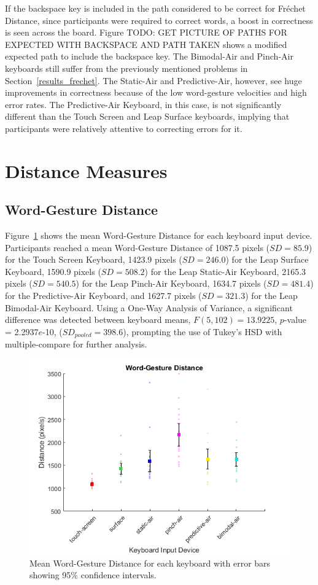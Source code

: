 If the backspace key is included in the path considered to be correct for Fr\'echet Distance, since participants were required to correct words, a boost in correctness is seen across the board. Figure TODO: GET PICTURE OF PATHS FOR EXPECTED WITH BACKSPACE AND PATH TAKEN shows a modified expected path to include the backspace key. The Bimodal-Air and Pinch-Air keyboards still suffer from the previously mentioned problems in Section~\ref{results_frechet}. The Static-Air and Predictive-Air, however, see huge improvements in correctness because of the low word-gesture velocities and high error rates. The Predictive-Air Keyboard, in this case, is not significantly different than the Touch Screen and Leap Surface keyboards, implying that participants were relatively attentive to correcting errors for it.

\section{Distance Measures}
\subsection{Word-Gesture Distance} \label{results_distance}
Figure~\ref{fig_distance_mean} shows the mean Word-Gesture Distance for each keyboard input device. Participants reached a mean Word-Gesture Distance of 1087.5 pixels ($SD = 85.9$) for the Touch Screen Keyboard, 1423.9 pixels ($SD = 246.0$) for the Leap Surface Keyboard, 1590.9 pixels ($SD = 508.2$) for the Leap Static-Air Keyboard, 2165.3 pixels ($SD = 540.5$) for the Leap Pinch-Air Keyboard, 1634.7 pixels ($SD = 481.4$) for the Predictive-Air Keyboard, and 1627.7 pixels ($SD = 321.3$) for the Leap Bimodal-Air Keyboard. Using a One-Way Analysis of Variance, a significant difference was detected between keyboard means, $F(5, 102) = 13.9225$, $p$-value = 2.2937$e$-10, ($SD_{pooled} = 398.6$), prompting the use of Tukey's HSD with multiple-compare for further analysis.

\begin{figure}[h]
	\centering
	\includegraphics{fig_distance_mean}
	\caption[Mean Word-Gesture Distance]{Mean Word-Gesture Distance for each keyboard with error bars showing 95\% confidence intervals.}
	\label{fig_distance_mean}
\end{figure}

